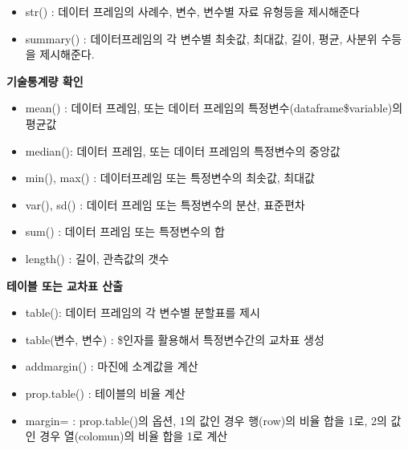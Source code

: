 \documentclass[
]{book}
\providecommand{\tightlist}{%
  \setlength{\itemsep}{0pt}\setlength{\parskip}{0pt}}
\begin{document}
\begin{itemize}
\tightlist
\item
  str() : 데이터 프레임의 사례수, 변수, 변수별 자료 유형등을 제시해준다
\item
  summary() : 데이터프레임의 각 변수별 최솟값, 최대값, 길이, 평균, 사분위 수등을 제시해준다.
\end{itemize}

\textbf{기술통계량 확인}

\begin{itemize}
\tightlist
\item
  mean() : 데이터 프레임, 또는 데이터 프레임의 특정변수(dataframe\$variable)의 평균값
\item
  median(): 데이터 프레임, 또는 데이터 프레임의 특정변수의 중앙값
\item
  min(), max() : 데이터프레임 또는 특정변수의 최솟값, 최대값
\item
  var(), sd() : 데이터 프레임 또는 특정변수의 분산, 표준편차
\item
  sum() : 데이터 프레임 또는 특정변수의 합
\item
  length() : 길이, 관측값의 갯수
\end{itemize}

\textbf{테이블 또는 교차표 산출}

\begin{itemize}
\tightlist
\item
  table(): 데이터 프레임의 각 변수별 분할표를 제시
\item
  table(변수, 변수) : \$인자를 활용해서 특정변수간의 교차표 생성\\
\item
  addmargin() : 마진에 소계값을 계산
\item
  prop.table() : 테이블의 비율 계산
\item
  margin= : prop.table()의 옵션, 1의 값인 경우 행(row)의 비율 합을 1로, 2의 값인 경우 열(colomun)의 비율 합을 1로 계산
\end{itemize}
\end{document}

